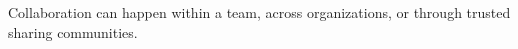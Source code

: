 \begin{frame}
\begin{center}
\begin{columns}[T]
        \end{columns}
    \end{center}

    \vspace{1em}

    \centering
    \small
    Collaboration can happen within a team, across organizations, or through trusted sharing communities.

\end{frame}

